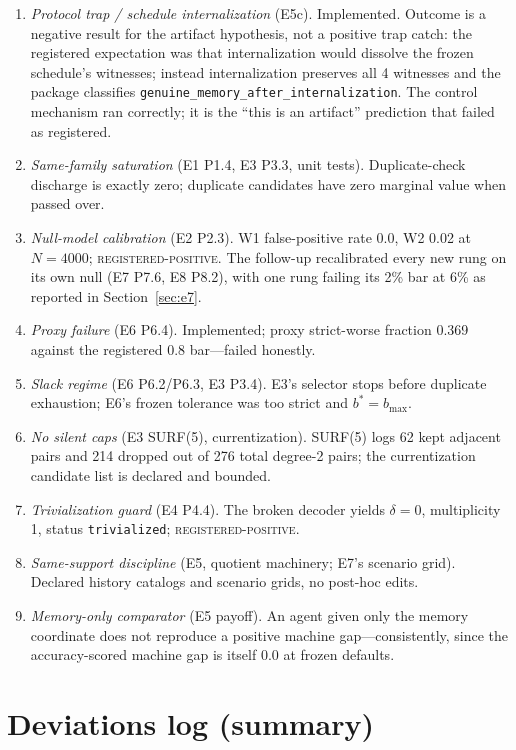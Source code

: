 \documentclass[11pt]{article}
\newcommand{\grade}[1]{\textsc{#1}}
\newcommand{\gRegPos}{\grade{registered-positive}}
\theoremstyle{definition}
\begin{document}
\begin{enumerate}
\item \emph{Protocol trap / schedule internalization} (E5c). Implemented. Outcome is a negative result for the artifact hypothesis, not a positive trap catch: the registered expectation was that internalization would dissolve the frozen schedule's witnesses; instead internalization preserves all 4 witnesses and the package classifies \texttt{genuine\_memory\_after\_internalization}. The control mechanism ran correctly; it is the ``this is an artifact'' prediction that failed as registered. \item \emph{Same-family saturation} (E1 P1.4, E3 P3.3, unit tests). Duplicate-check discharge is exactly zero; duplicate candidates have zero marginal value when passed over. \item \emph{Null-model calibration} (E2 P2.3). W1 false-positive rate 0.0, W2 0.02 at $N{=}4000$; \gRegPos. The follow-up recalibrated every new rung on its own null (E7 P7.6, E8 P8.2), with one rung failing its 2\% bar at 6\% as reported in Section~\ref{sec:e7}. \item \emph{Proxy failure} (E6 P6.4). Implemented; proxy strict-worse fraction 0.369 against the registered 0.8 bar---failed honestly. \item \emph{Slack regime} (E6 P6.2/P6.3, E3 P3.4). E3's selector stops before duplicate exhaustion; E6's frozen tolerance was too strict and $b^{*} = b_{\max}$. \item \emph{No silent caps} (E3 SURF(5), currentization). SURF(5) logs 62 kept adjacent pairs and 214 dropped out of 276 total degree-2 pairs; the currentization candidate list is declared and bounded. \item \emph{Trivialization guard} (E4 P4.4). The broken decoder yields $\delta = 0$, multiplicity 1, status \texttt{trivialized}; \gRegPos. \item \emph{Same-support discipline} (E5, quotient machinery; E7's scenario grid). Declared history catalogs and scenario grids, no post-hoc edits.
\item \emph{Memory-only comparator} (E5 payoff). An agent given only the memory coordinate does not reproduce a positive machine gap---consistently, since the accuracy-scored machine gap is itself 0.0 at frozen defaults. \end{enumerate}

 \section{Deviations log (summary)}
\label{app:deviations}
\end{document}
